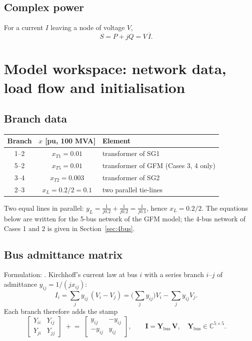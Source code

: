 \documentclass[11pt,a4paper]{article}
\numberwithin{equation}{section}
\newcommand{\cj}[1]{\overline{#1}}
\begin{document}
\subsection{Complex power}
For a current $I$ leaving a node of voltage $V$,
\begin{equation}
S = P + jQ = V\,\cj{I}.
\end{equation}

\section{Model workspace: network data, load flow and initialisation}

\subsection{Branch data}
\begin{center}
\begin{tabular}{ccl}
\toprule
Branch & $x$ [pu, 100 MVA] & Element\\
\midrule
1--2 & $x_{T1}=0.01$ & transformer of SG1\\
5--2 & $x_{T5}=0.01$ & transformer of GFM (Cases 3, 4 only)\\
3--4 & $x_{T2}=0.003$ & transformer of SG2\\
2--3 & $x_L = 0.2/2 = 0.1$ & two parallel tie-lines\\
\bottomrule
\end{tabular}
\end{center}
Two equal lines in parallel: $y_L = \frac{1}{j0.2}+\frac{1}{j0.2} = \frac{1}{j0.1}$, hence $x_L = 0.2/2$.
The equations below are written for the 5-bus network of the GFM model; the 4-bus network of Cases 1 and 2 is given in Section~\ref{sec:4bus}.

\subsection{Bus admittance matrix}
Formulation: \cite{BergenVittal2000}.
Kirchhoff's current law at bus $i$ with a series branch $i$--$j$ of admittance $y_{ij}=1/(jx_{ij})$:
\begin{equation}
I_i = \sum_{j} y_{ij}\,(V_i - V_j)
= \Big(\sum_j y_{ij}\Big)V_i - \sum_j y_{ij} V_j .
\end{equation}
Each branch therefore adds the stamp
\begin{equation}
\begin{bmatrix} Y_{ii} & Y_{ij}\\ Y_{ji} & Y_{jj}\end{bmatrix}
\;\mathrel{+}=\;
\begin{bmatrix} y_{ij} & -y_{ij}\\ -y_{ij} & y_{ij}\end{bmatrix},
\qquad
\bm I = \bm Y_{\text{bus}}\,\bm V,\quad \bm Y_{\text{bus}}\in\mathbb C^{5\times 5}.
\end{equation}
\end{document}
